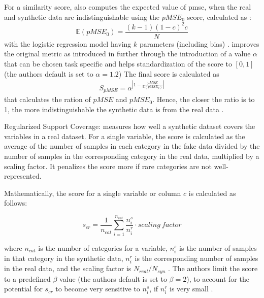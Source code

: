 \begin{description}
  For a similarity score, \cite{chundawat2022UniversalMetricRobust} also computes the expected value of \gls{pmse}, when the real and synthetic data are indistinguishable 
  using the $pMSE_0$ score, calculated as \cite{snoke2018GeneralSpecificUtility,chundawat2022UniversalMetricRobust}:
  $$\mathbb{E}(pMSE_0) = \frac{(k-1)(1-c)^2c}{N}$$
  with the logistic regression model having $k$ parameters (including bias) \cite{chundawat2022UniversalMetricRobust}.
  \cite{chundawat2022UniversalMetricRobust} improves the original metric as introduced in \cite{snoke2018GeneralSpecificUtility} further through the introduction
  of a value $\alpha$ that can be chosen task specific and helps standardization of the score to $[0,1]$ (the authors default is set to $\alpha=1.2$)
  The final score is calculated as 
  \begin{equation}
    \begin{align*}
      \label{eqn:s_pmse}
      S_{pMSE} = \alpha^{|1-\frac{pMSE}{\mathbb{E}(pMSE_0)}|}
      \end{align*}
  \end{equation}
  that calculates the ration of $pMSE$ and $pMSE_0$.
  Hence, the closer the ratio is to 1, the more indistinguishable the synthetic data is from the real data \cite{chundawat2022UniversalMetricRobust}.
  

  \item Regularized Support Coverage:
  measures how well a synthetic dataset covers the variables in a real dataset. 
  For a single variable, the score is calculated as the average of the number of samples in each category in the fake data 
  divided by the number of samples in the corresponding category in the real data, multiplied by a scaling factor. 
  It penalizes the score more if rare categories are not well-represented. 
  
  Mathematically, the score for a single variable or column $c$ is calculated as follows:

  $$ s_{cr} = \frac{1}{n_{cat}} \sum_{i=1}^{n_{cat}} \frac{n^s_i}{n^r_i} \cdot scaling~factor $$

where $n_{cat}$ is the number of categories for a variable, $n^s_i$ is the number of samples in that category in the synthetic data, $n^r_i$ is the corresponding number of samples in the real data, and the scaling factor is $N_{real}/N_{syn}$ \cite{chundawat2022UniversalMetricRobust}.
The authors limit the score to a predefined $\beta$ value (the authors default is set to $\beta=2$), to account for the potential for $s_{cr}$ to become very sensitive to $n^s_i$, if $n^r_i$ is very small \cite{chundawat2022UniversalMetricRobust}.


\end{description}
